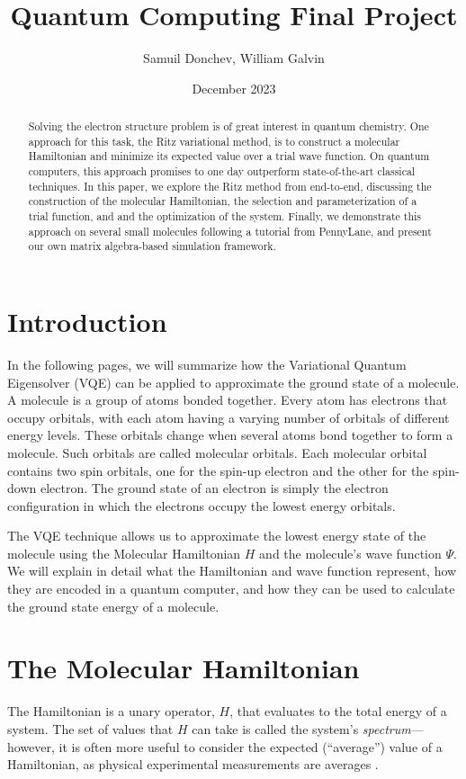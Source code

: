 \documentclass[11pt]{article}
\title{
    \vspace{-2.5cm}
    Quantum Computing Final Project
}
\author{
    Samuil Donchev, William Galvin
}
\date{
    \vspace{-.75cm}
    December 2023
}
\begin{document}
\maketitle

\begin{abstract}
Solving the electron structure problem is of great interest in quantum chemistry. One approach for this task, the Ritz variational method, is to construct a molecular Hamiltonian and minimize its expected value over a trial wave function. On quantum computers, this approach promises to one day outperform state-of-the-art classical techniques. In this paper, we explore the Ritz method from end-to-end, discussing the construction of the molecular Hamiltonian, the selection and parameterization of a trial function, and and the optimization of the system. Finally, we demonstrate this approach on several small molecules following a tutorial from PennyLane, and present our own matrix algebra-based simulation framework.
\end{abstract}

\section{Introduction}
In the following pages, we will summarize how the Variational Quantum Eigensolver (VQE) can be applied to approximate the ground state of a molecule. A molecule is a group of atoms bonded together. Every atom has electrons that occupy orbitals, with each atom having a varying number of orbitals of different energy levels. These orbitals change when several atoms bond together to form a molecule. Such orbitals are called molecular orbitals. Each molecular orbital contains two spin orbitals, one for the spin-up electron and the other for the spin-down electron. The ground state of an electron is simply the electron configuration in which the electrons occupy the lowest energy orbitals. 

The VQE technique allows us to approximate the lowest energy state of the molecule using the Molecular Hamiltonian $H$ and the molecule's wave function $\Psi$. We will explain in detail what the Hamiltonian and wave function represent, how they are encoded in a quantum computer, and how they can be used to calculate the ground state energy of a molecule. 

\section{The Molecular Hamiltonian}
The Hamiltonian is a unary operator, $H$, that evaluates to the total energy of a system. The set of values that $H$ can take is called the system’s \emph{spectrum}---however, it is often more useful to consider the expected (“average”) value of a Hamiltonian, as physical experimental measurements are averages \cite{Skylaris-L2}.
\end{document}
